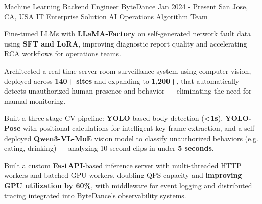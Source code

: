 
\begin{cventries}
  \cventry
    {Machine Learning Backend Engineer} %
    {ByteDance} %
    {Jan 2024 - Present} %
    {San Jose, CA, USA} %
    {IT Enterprise Solution AI Operations Algorithm Team}
    {
      \begin{cvitems} %
        \item {Fine-tuned LLMs with \textbf{LLaMA-Factory} on self-generated network fault data using \textbf{SFT and LoRA}, improving diagnostic report quality and accelerating RCA workflows for operations teams.}
        \item {Architected a real-time server room surveillance system using computer vision, deployed across \textbf{140+ sites} and expanding to \textbf{1,200+}, that automatically detects unauthorized human presence and behavior — eliminating the need for manual monitoring.}
        \item {Built a three-stage CV pipeline: \textbf{YOLO}-based body detection (\textbf{<1s}), \textbf{YOLO-Pose} with positional calculations for intelligent key frame extraction, and a self-deployed \textbf{Qwen3-VL-MoE} vision model to classify unauthorized behaviors (e.g. eating, drinking) — analyzing 10-second clips in under \textbf{5 seconds}.}
        \item {Built a custom \textbf{FastAPI}-based inference server with multi-threaded HTTP workers and batched GPU workers, doubling QPS capacity and \textbf{improving GPU utilization by 60\%}, with middleware for event logging and distributed tracing integrated into ByteDance’s observability systems.}

\end{cvitems}}
\end{cventries}
